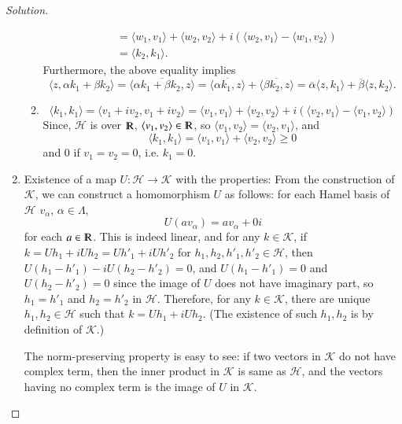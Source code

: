 \documentclass[a4paper, 12pt]{article}
\theoremstyle{Mydefinition}
\theoremstyle{Mytheorem}
\begin{document}
\begin{proof}[Solution]
\begin{enumerate}
\begin{enumerate}
\begin{equation}
\begin{split}
            &= \langle w_1,v_1\rangle + \langle w_2,v_2\rangle + i\left(\langle w_2,v_1\rangle - \langle w_1 ,v_2\rangle \right) \\
            &=\langle k_2, k_1\rangle.
        \end{split}
        \end{equation}
        Furthermore, the above equality implies
        \begin{equation}
            \langle z, \alpha k_1+\beta k_2\rangle = \overline{\langle \alpha k_1+\beta k_2, z\rangle} = \overline{\langle \alpha k_1, z\rangle} + \overline{\langle \beta k_2,z\rangle} = \overline{\alpha}\langle z,k_1\rangle + \overline{\beta}\langle z, k_2\rangle.
        \end{equation}
        \item \begin{equation}
            \langle k_1, k_1\rangle = \langle v_1+iv_2, v_1+iv_2\rangle = \langle v_1, v_1\rangle + \langle v_2, v_2\rangle + i\left(\langle v_2, v_1\rangle - \langle v_1, v_2\rangle\right)
        \end{equation}
        Since, $\mathscr{H}$ is over $\varmathbb{R}$, $\langle v_1,v_2\rangle\in \varmathbb{R}$, so $\langle v_1, v_2\rangle= \langle v_2, v_1\rangle$, and
        \begin{equation}
            \langle k_1, k_1\rangle = \langle v_1, v_1\rangle + \langle v_2, v_2\rangle\geq 0
        \end{equation}
        and $0$ if $v_1=v_2=0$, i.e. $k_1=0$.
    \end{enumerate}
    \item Existence of a map $U:\mathscr{H}\rightarrow\mathscr{K}$ with the properties: From the construction of $\mathscr{K}$, we can construct a homomorphism $U$ as follows: for each Hamel basis of $\mathscr{H}$ $v_\alpha$, $\alpha\in \Lambda$,
    \begin{equation}
        U(a v_\alpha) = a v_\alpha + 0i
    \end{equation}
    for each $a\in \varmathbb{R}$. This is indeed linear, and for any $k\in\mathscr{K}$, if $k=Uh_1+iUh_2 = Uh'_1+iUh'_2$ for $h_1,h_2,h'_1,h'_2\in \mathscr{H}$, then $U(h_1-h'_1)-iU(h_2-h'_2) = 0$, and $U(h_1-h'_1)=0$ and $U(h_2-h'_2)=0$ since the image of $U$ does not have imaginary part, so $h_1=h'_1$ and $h_2=h'_2$ in $\mathscr{H}$. Therefore, for any $k\in\mathscr{K}$, there are unique $h_1,h_2\in\mathscr{H}$ such that $k=Uh_1+iUh_2$. (The existence of such $h_1,h_2$ is by definition of $\mathscr{K}$.)
    
    The norm-preserving property is easy to see: if two vectors in $\mathscr{K}$ do not have complex term, then the inner product in $\mathscr{K}$ is same as $\mathscr{H}$, and the vectors having no complex term is the image of $U$ in $\mathscr{K}$.
\end{enumerate}
\end{proof}
\end{document}
